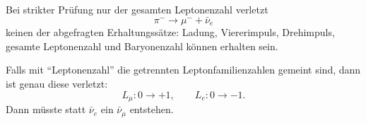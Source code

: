 \documentclass[11pt,a4paper]{scrartcl}
\begin{document}
\begin{answerbox}
Bei strikter Prüfung nur der gesamten Leptonenzahl verletzt
\[
\pi^-\to\mu^-+\bar\nu_e
\]
keinen der abgefragten Erhaltungssätze: Ladung, Viererimpuls, Drehimpuls, gesamte Leptonenzahl und Baryonenzahl können erhalten sein.

Falls mit ``Leptonenzahl'' die getrennten Leptonfamilienzahlen gemeint sind, dann ist genau diese verletzt:
\[
\boxed{L_\mu:0\to+1,
\qquad
L_e:0\to-1.}
\]
Dann müsste statt $\bar\nu_e$ ein $\bar\nu_\mu$ entstehen.
\end{answerbox}
\end{document}
